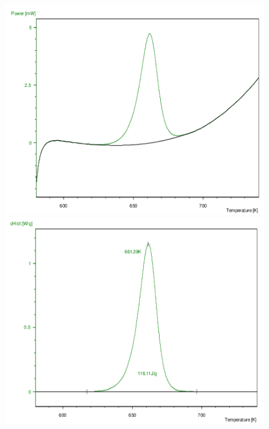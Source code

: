 \documentclass[12pt,a4paper]{article}
\begin{document}
\newpage
\begin{figure}[!htb]
\hspace*{-20pt}
  \includegraphics[width=\linewidth]{10fin}
\endminipage
\hspace*{10pt}
  \includegraphics[width=\linewidth]{11fin}
\endminipage
\\
\hspace*{-20pt}

\end{figure}
\end{document}
